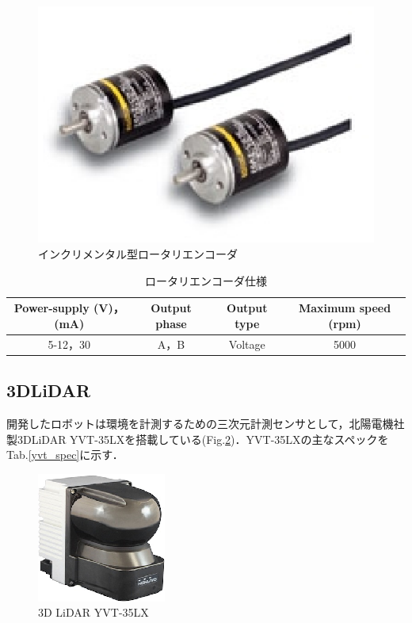 \begin{figure}[hb]
	\centering
	\includegraphics[clip,scale=1.0]{./figure/e6a2-c.eps}
	\caption{インクリメンタル型ロータリエンコーダ}
	\label{encoder_fig}
\end{figure}

\begin{table}[hb]
	\centering
	\caption{ロータリエンコーダ仕様}
	\begin{tabular}{|c|c|c|c|} \hline
		Power-supply (V)，(mA) & Output phase & Output type & Maximum speed (rpm) \\ \hline \hline
		5-12，30 & A，B & Voltage & 5000 \\ \hline
	\end{tabular}
	\label{encoder_spec}
\end{table}
\newpage

\subsection{3DLiDAR} \label{LiDAR}
\par 開発したロボットは環境を計測するための三次元計測センサとして，北陽電機社製3DLiDAR YVT-35LXを搭載している(Fig.\ref{yvt-35lx})．YVT-35LXの主なスペックをTab.\ref{yvt_spec}に示す．


\begin{figure}[hb]
	\centering
	\includegraphics[clip,scale=2.5]{./figure/yvt-35lx.eps}
	\caption{3D LiDAR YVT-35LX}
	\label{yvt-35lx}
\end{figure}

